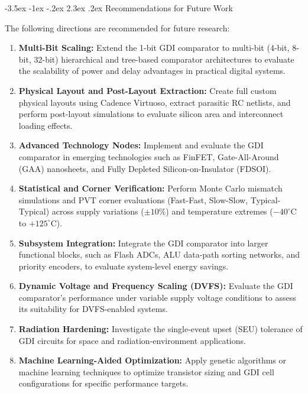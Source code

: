 \documentclass[12pt,a4paper,oneside]{report}
\makeatletter
\renewcommand\section{\@startsection {section}{1}{\z@}%
                                   {-3.5ex \@plus -1ex \@minus -.2ex}%
                                   {2.3ex \@plus.2ex}%
                                   {\normalfont\normalsize\bfseries}}
\makeatother
\begin{document}
\section{Recommendations for Future Work}

The following directions are recommended for future research:

\begin{enumerate}
\item \textbf{Multi-Bit Scaling:} Extend the 1-bit GDI comparator to multi-bit (4-bit, 8-bit, 32-bit) hierarchical and tree-based comparator architectures to evaluate the scalability of power and delay advantages in practical digital systems.
\item \textbf{Physical Layout and Post-Layout Extraction:} Create full custom physical layouts using Cadence Virtuoso, extract parasitic RC netlists, and perform post-layout simulations to evaluate silicon area and interconnect loading effects.
\item \textbf{Advanced Technology Nodes:} Implement and evaluate the GDI comparator in emerging technologies such as FinFET, Gate-All-Around (GAA) nanosheets, and Fully Depleted Silicon-on-Insulator (FDSOI).
\item \textbf{Statistical and Corner Verification:} Perform Monte Carlo mismatch simulations and PVT corner evaluations (Fast-Fast, Slow-Slow, Typical-Typical) across supply variations ($\pm 10\%$) and temperature extremes ($-40^\circ\text{C}$ to $+125^\circ\text{C}$).
\item \textbf{Subsystem Integration:} Integrate the GDI comparator into larger functional blocks, such as Flash ADCs, ALU data-path sorting networks, and priority encoders, to evaluate system-level energy savings.
\item \textbf{Dynamic Voltage and Frequency Scaling (DVFS):} Evaluate the GDI comparator's performance under variable supply voltage conditions to assess its suitability for DVFS-enabled systems.
\item \textbf{Radiation Hardening:} Investigate the single-event upset (SEU) tolerance of GDI circuits for space and radiation-environment applications.
\item \textbf{Machine Learning-Aided Optimization:} Apply genetic algorithms or machine learning techniques to optimize transistor sizing and GDI cell configurations for specific performance targets.
\end{enumerate}


\clearpage
\end{document}
